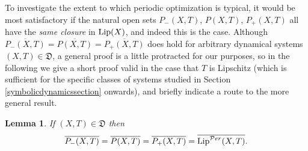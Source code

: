 \documentclass[reqno,11pt]{amsart}
\newtheorem{lem}[thm]{Lemma}
\theoremstyle{definition}
\theoremstyle{remark}
\theoremstyle{remark}
\def\per{{\mathcal{P}er}}
\def\lip{{\rm Lip}}
\def\D{\mathfrak{D}}
\numberwithin{equation}{section}
\begin{document}
To investigate the extent to which periodic optimization is typical, it would be most satisfactory if the natural 
open sets
$P_-(X,T)$, $P(X,T)$, $P_+(X,T)$ all have the \emph{same closure} in $\lip(X)$,
and indeed this is the case.
Although 
$
\overline{P_-(X,T)} = \overline{ P(X,T)} =  \overline{ P_+(X,T)}
$
does hold for arbitrary dynamical systems $(X,T)\in\D$,
a general proof 
is a little protracted for our purposes,
so in the following we give a short proof valid in the case
that $T$ is Lipschitz
(which is sufficient for the 
specific classes of systems studied in Section \ref{symbolicdynamicssection} onwards), 
and briefly indicate a route to the more general result.

\begin{lem}\label{four_closures}
If $(X,T)\in\D$ 
then
\begin{equation}\label{4closuresequal}
\overline{P_-(X,T)} = \overline{ P(X,T)} =  \overline{ P_+(X,T)} = \overline{\lip^\per(X,T)}.
\end{equation}
\end{lem}
\end{document}
